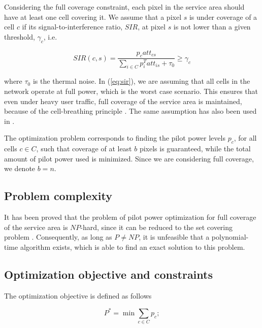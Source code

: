 Considering the full coverage constraint, each pixel in the service
area should have at least one cell covering it. We assume that a pixel
$s$ is under coverage of a cell $c$ if its signal-to-interference
ratio, $SIR$, at pixel $s$ is not lower than a given threshold,
$\gamma_{c}$, i.e.

\begin{equation}
SIR(c,s)=\frac{p_{c}att_{cs}}{\sum_{i\in C}p_{i}^{T}att_{is}+\tau_{0}}\ge\gamma_{c}\label{eq:sir}
\end{equation}


where $\tau_{0}$ is the thermal noise. In (\ref{eq:sir}), we are
assuming that all cells in the network operate at full power, which
is the worst case scenario. This ensures that even under heavy user
traffic, full coverage of the service area is maintained, because
of the cell-breathing principle \cite{Holma_WCDMA.for.UMTS:2005}.
The same assumption has also been used in \cite{Siomina:Minimum.pilot.power.for.service.coverage,Chen-Yuan_CPICH.optimization:2008}.

The optimization problem corresponds to finding the pilot power levels
$p_{c}$, for all cells $c\in C$, such that coverage of at least
$b$ pixels is guaranteed, while the total amount of pilot power used
is minimized. Since we are considering full coverage, we denote $b=n$.


\subsection{Problem complexity \label{sub:Problem-complexity}}

It has been proved that the problem of pilot power optimization for
full coverage of the service area is $NP$-hard, since it can be reduced
to the set covering problem \cite{Varbrand_Mathematical.programming.approach:2003}.
Consequently, as long as $P\neq NP$, it is unfeasible that a polynomial-time
algorithm exists, which is able to find an exact solution to this
problem.


\subsection{Optimization objective and constraints}

The optimization objective is defined as follows

\begin{equation}
P^{*}=\min\sum_{c\in C}p_{c};\label{eq:objective_function-1}
\end{equation}


